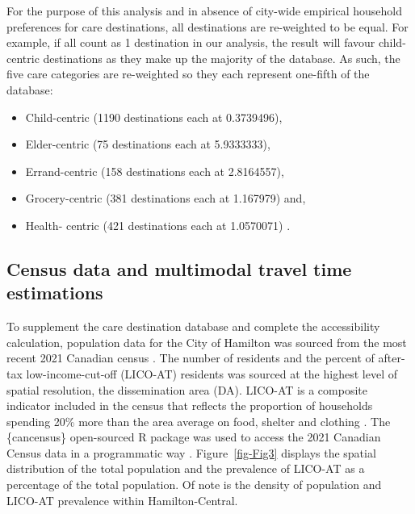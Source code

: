 \documentclass[
  super,
  preprint,
  3p]{elsarticle}
\providecommand{\tightlist}{%
  \setlength{\itemsep}{0pt}\setlength{\parskip}{0pt}}\usepackage{longtable,booktabs,array}
\begin{document}
For the purpose of this analysis and in absence of city-wide empirical
household preferences for care destinations, all destinations are
re-weighted to be equal. For example, if all count as 1 destination in
our analysis, the result will favour child-centric destinations as they
make up the majority of the database. As such, the five care categories
are re-weighted so they each represent one-fifth of the database:

\begin{itemize}
\tightlist
\item
  Child-centric (1190 destinations each at 0.3739496),
\item
  Elder-centric (75 destinations each at 5.9333333),
\item
  Errand-centric (158 destinations each at 2.8164557),
\item
  Grocery-centric (381 destinations each at 1.167979) and,
\item
  Health- centric (421 destinations each at 1.0570071) .
\end{itemize}

\hypertarget{census-data-and-multimodal-travel-time-estimations}{%
\subsection{Census data and multimodal travel time
estimations}\label{census-data-and-multimodal-travel-time-estimations}}

To supplement the care destination database and complete the
accessibility calculation, population data for the City of Hamilton was
sourced from the most recent 2021 Canadian census
\citep{governmentofcanadaCensusPopulation2023}. The number of residents
and the percent of after-tax low-income-cut-off (LICO-AT) residents was
sourced at the highest level of spatial resolution, the dissemination
area (DA). LICO-AT is a composite indicator included in the census that
reflects the proportion of households spending 20\% more than the area
average on food, shelter and clothing
\citep{governmentofcanadaLowIncomeCutoffs2023}. The \{cancensus\}
open-sourced R package was used to access the 2021 Canadian Census data
in a programmatic way \citep{vonbergmannCancensusCensusMapper2021}.
Figure~\ref{fig-Fig3} displays the spatial distribution of the total
population and the prevalence of LICO-AT as a percentage of the total
population. Of note is the density of population and LICO-AT prevalence
within Hamilton-Central.
\end{document}
